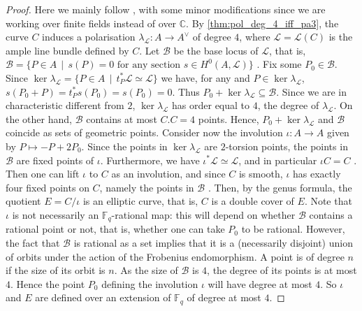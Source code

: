 \documentclass[11pt]{amsart}
\newcommand\Fq{\mathbb{F}_q}
\theoremstyle{plain}
\theoremstyle{definition}
\begin{document}
\begin{proof}
    Here we mainly follow \cite[Sec.~1.2]{Barth}, with some minor modifications since we are working over finite fields instead of over $\mathbb{C}$.
    By \cref{thm:pol_deg_4_iff_pa3}, the curve $C$ induces a polarisation $\lambda_{\mathcal{L}}:A\to A^\vee$ of degree $4$, where $\mathcal{L}=\mathcal{L}(C)$ is the ample line bundle defined by $C$. Let $\mathcal{B}$ be the base locus of $\mathcal{L}$, that is, $\mathcal{B} = \{P\in A \,\mid\, s(P)=0 \text{ for any section } s\in H^0(A,\mathcal{L})\}$ \cite[II, Lem.~7.8]{Hart}. Fix some $P_0\in \mathcal{B}$. Since $\ker \lambda_{\mathcal{L}}= \{P\in A \,\mid\, t_P^* \mathcal{L}\simeq \mathcal{L}\}$ \cite[Ch.~I, Sec.~8]{MilneAV} we have, for any and $P\in \ker \lambda_{\mathcal{L}}$, $s(P_0+P)=t_P^* s(P_0)=s(P_0)=0$. Thus $P_0+ \ker\lambda_{\mathcal{L}}\subseteq  \mathcal{B}$. Since we are in characteristic different from $2$, $ \ker \lambda_{\mathcal{L}}$ has order equal to $4$, the degree of $\lambda_{\mathcal{L}}$. On the other hand, $\mathcal{B}$ contains at most $C.C=4$ points. Hence, $ P_0+\ker\lambda_{\mathcal{L}}$ and  $\mathcal{B}$ coincide as sets of geometric points. Consider now the involution $\iota: A\to A$ given by $P\mapsto -P+2P_0$. Since the points in $\ker \lambda_{\mathcal{L}}$ are $2$-torsion points, the points in $\mathcal{B}$ are fixed points of $\iota$. %
    Furthermore, we have $\iota^*\mathcal{L}\simeq \mathcal{L}$, and in particular $\iota C = C$ \cite[Prop.~1.6]{Barth}.  Then one can lift $\iota$ to $C$ as an involution, and since $C$ is smooth, $\iota$ has exactly four fixed points on $C$, namely the points in $\mathcal{B}$  \cite[1.7]{Barth}. Then, by the genus formula, the quotient $E= C/\iota$ is an elliptic curve, that is, $C$ is a double cover of $E$. Note that $\iota$ is not necessarily an $\Fq$-rational map: this will depend on whether  $\mathcal{B}$ contains a rational point or not, that is, whether one can take $P_0$ to be rational.  However, the fact that $\mathcal{B}$ is rational as a set implies that it is a (necessarily disjoint) union of orbits under the action of the Frobenius endomorphism. A point is of degree $n$ if the size of its orbit is $n$. As the size of $\mathcal{B}$ is $4$, the degree of its points is at most $4$. Hence the point $P_0$ defining the involution $\iota$ will have degree at most $4$. So $\iota$ and  $E$ are defined over an extension of $\Fq$ of degree at most $4$.  
\end{proof}
\end{document}
